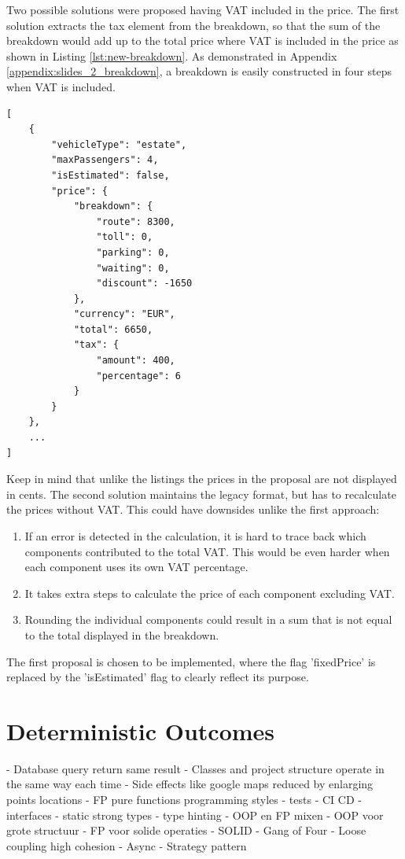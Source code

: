 Two possible solutions were proposed having VAT included in the price. The first solution extracts the tax element from the breakdown, so that the sum of the breakdown would add up to the total price where VAT is included in the price as shown in Listing \ref{lst:new-breakdown}. As demonstrated in Appendix \ref{appendix:slides_2_breakdown}, a breakdown is easily constructed in four steps when VAT is included.

\begin{lstlisting}[caption={Improved price breakdown}, label={lst:new-breakdown}]
[
	{
		"vehicleType": "estate",
		"maxPassengers": 4,
		"isEstimated": false,
		"price": {
			"breakdown": {
				"route": 8300,
				"toll": 0,
				"parking": 0,
				"waiting": 0,
				"discount": -1650
			},
			"currency": "EUR",
			"total": 6650,
			"tax": {
				"amount": 400,
				"percentage": 6
			}
		}
	},
	...
]
\end{lstlisting}

Keep in mind that unlike the listings the prices in the proposal are not displayed in cents. The second solution maintains the legacy format, but has to recalculate the prices without VAT. This could have downsides unlike the first approach:

\begin{enumerate}
	\item If an error is detected in the calculation, it is hard to trace back which components contributed to the total VAT. This would be even harder when each component uses its own VAT percentage.
	\item It takes extra steps to calculate the price of each component excluding VAT.
	\item Rounding the individual components could result in a sum that is not equal to the total displayed in the breakdown.
\end{enumerate}

The first proposal is chosen to be implemented, where the flag 'fixedPrice' is replaced by the 'isEstimated' flag to clearly reflect its purpose.

%
\section{Deterministic Outcomes}
- Database query return same result
- Classes and project structure operate in the same way each time
- Side effects like google maps reduced by enlarging points locations
- FP pure functions programming styles
- tests
- CI CD
- interfaces
- static strong types
- type hinting
- OOP en FP mixen
- OOP voor grote structuur
- FP voor solide operaties
- SOLID
- Gang of Four
- Loose coupling high cohesion
- Async
- Strategy pattern

